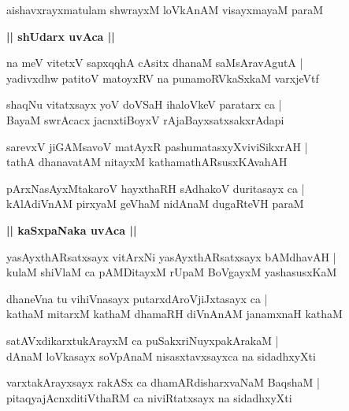 \documentclass[twoside,12pt,openright]{book}
\newcounter{shloka}[chapter]
\def\uvaca#1{\centerline{{\large\textbf{#1}}}}
\begin{document}
\begin{shloka}%
aishavxrayxmatulam shwrayxM loVkAnAM visayxmayaM paraM 
\end{shloka}

\uvaca{|| shUdarx uvAca ||}

\begin{shloka}%
na meV vitetxV sapxqqhA cAsitx dhanaM saMsAravAgutA |\\
yadivxdhw patitoV matoyxRV na punamoRVkaSxkaM varxjeVtf
\end{shloka}

\begin{shloka}%
shaqNu vitatxsayx yoV doVSaH ihaloVkeV paratarx ca |\\
BayaM swrAcacx jacnxtiBoyxV rAjaBayxsatxsakxrAdapi
\end{shloka}

\begin{shloka}%
sarevxV jiGAMsavoV matAyxR pashumatasxyXviviSikxrAH |\\
tathA dhanavatAM nitayxM kathamathARsusxKAvahAH 
\end{shloka}

\begin{shloka}%
pArxNasAyxMtakaroV hayxthaRH sAdhakoV duritasayx ca |\\
kAlAdiVnAM pirxyaM geVhaM nidAnaM dugaRteVH paraM
\end{shloka}

\uvaca{|| kaSxpaNaka uvAca ||}

\begin{shloka}%
yasAyxthARsatxsayx vitArxNi yasAyxthARsatxsayx bAMdhavAH |\\
kulaM shiVlaM ca pAMDitayxM rUpaM BoVgayxM yashasusxKaM
\end{shloka}

\begin{shloka}%
dhaneVna tu vihiVnasayx putarxdAroVjiJxtasayx ca |\\
kathaM mitarxM kathaM dhamaRH diVnAnAM janamxnaH kathaM 
\end{shloka}

\begin{shloka}%
satAVxdikarxtukArayxM ca puSakxriNuyxpakArakaM |\\
dAnaM loVkasayx soVpAnaM nisasxtavxsayxca na sidadhxyXti
\end{shloka}

\begin{shloka}%
varxtakArayxsayx rakASx ca dhamARdisharxvaNaM BaqshaM |\\
pitaqyajAcnxditiVthaRM ca niviRtatxsayx na sidadhxyXti
\end{shloka}
\end{document}
